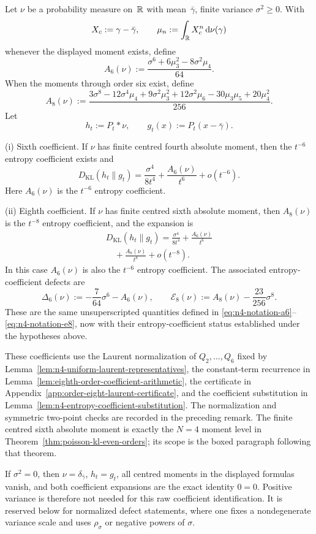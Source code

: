 \begin{theorem}%
\label{thm:poisson-kl-eighth}
Let $\nu$ be a probability measure on~$\mathbb{R}$ with mean~$\bar{\gamma}$,
finite variance $\sigma^2\ge0$.  With
\[
X_c:=\gamma-\bar{\gamma},
\qquad
\mu_n:=\int_{\mathbb{R}}X_c^n\,\mathrm{d}\nu(\gamma)
\]
whenever the displayed moment exists, define
\[
A_6(\nu)
:=\frac{\sigma^6+6\mu_3^2-8\sigma^2\mu_4}{64}.
\]
When the moments through order six exist, define
\[
A_8(\nu)
:=
\frac{3\sigma^8-12\sigma^4\mu_4+9\sigma^2\mu_3^2
+12\sigma^2\mu_6-30\mu_3\mu_5+20\mu_4^2}{256}.
\]
Let
\[
h_t:=P_t*\nu,
\qquad
g_t(x):=P_t(x-\bar{\gamma}).
\]

\textup{(i) Sixth coefficient.}
If \(\nu\) has finite centred fourth absolute moment, then the \(t^{-6}\)
entropy coefficient exists and
\[
D_{\mathrm{KL}}(h_t\|g_t)
=\frac{\sigma^4}{8t^4}
+\frac{A_6(\nu)}{t^6}
+o(t^{-6}).
\]
Here \(A_6(\nu)\) is the \(t^{-6}\) entropy coefficient.

\textup{(ii) Eighth coefficient.}
If \(\nu\) has finite centred sixth absolute moment, then \(A_8(\nu)\) is the
\(t^{-8}\) entropy coefficient, and the expansion is
\begin{equation}\label{eq:poisson-kl-eighth}
\begin{split}
D_{\mathrm{KL}}(h_t\|g_t)
=\frac{\sigma^4}{8t^4}
+\frac{A_6(\nu)}{t^6}
\\
\quad
+\frac{A_8(\nu)}{t^8}
+o(t^{-8}).
\end{split}
\end{equation}
In this case \(A_6(\nu)\) is also the \(t^{-6}\) entropy coefficient.
The associated entropy-coefficient defects are
\[
\Delta_6(\nu)
:=-\frac{7}{64}\sigma^6-A_6(\nu),
\qquad
\mathcal E_8(\nu)
:=A_8(\nu)-\frac{23}{256}\sigma^8.
\]
These are the same unsuperscripted quantities defined in
\eqref{eq:n4-notation-a6}--\eqref{eq:n4-notation-e8}, now with their
entropy-coefficient status established under the hypotheses above.

These coefficients use the Laurent normalization of
\(Q_2,\ldots,Q_6\) fixed by
Lemma~\ref{lem:n4-uniform-laurent-representatives}, the constant-term
recurrence in Lemma~\ref{lem:eighth-order-coefficient-arithmetic}, the
certificate in Appendix~\ref{app:order-eight-laurent-certificate}, and the
coefficient substitution in
Lemma~\ref{lem:n4-entropy-coefficient-substitution}.  The normalization and
symmetric two-point checks are recorded in the preceding remark.  The finite
centred sixth absolute moment is exactly the \(N=4\) moment level in
Theorem~\ref{thm:poisson-kl-even-orders}; its scope is the boxed paragraph
following that theorem.

If \(\sigma^2=0\), then \(\nu=\delta_{\bar{\gamma}}\),
\(h_t=g_t\), all centred moments in the displayed formulas vanish, and both
coefficient expansions are the exact identity \(0=0\).  Positive variance is
therefore not needed for this raw coefficient identification.  It is reserved
below for normalized defect statements, where one fixes a nondegenerate
variance scale and uses \(\rho_\sigma\) or negative powers of \(\sigma\).
\end{theorem}

